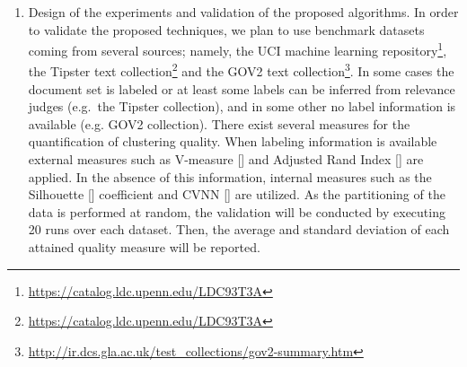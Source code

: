 \documentclass[10pt]{article}
\begin{document}
\begin{enumerate}
\item Design of the experiments and validation of the proposed algorithms. 
In order to validate the proposed techniques, we plan to use benchmark datasets coming from several sources; namely, the UCI machine learning repository\footnote{\url{https://catalog.ldc.upenn.edu/LDC93T3A}}, the Tipster text collection\footnote{\url{https://catalog.ldc.upenn.edu/LDC93T3A}} and the GOV2 text collection\footnote{\url{http://ir.dcs.gla.ac.uk/test_collections/gov2-summary.htm}}. 
In some cases the document set is labeled or at least some labels can be inferred from relevance judges (e.g.\ the Tipster collection), and in some other no label information is available (e.g. GOV2 collection).
 There exist several measures for the quantification of clustering quality. When labeling information is available external measures such as V-measure [\cite{RH07}] and Adjusted Rand Index [\cite{HA85}] are applied. 
In the absence of this information, internal measures such as the Silhouette [\cite{R87}] coefficient and CVNN [\cite{LLXGWW13}] are utilized.
As the partitioning of the data is performed at random, the validation will be conducted by executing 20 runs over each dataset. Then, the average and standard deviation of each attained quality measure will be reported.

\end{enumerate}
\end{document}
